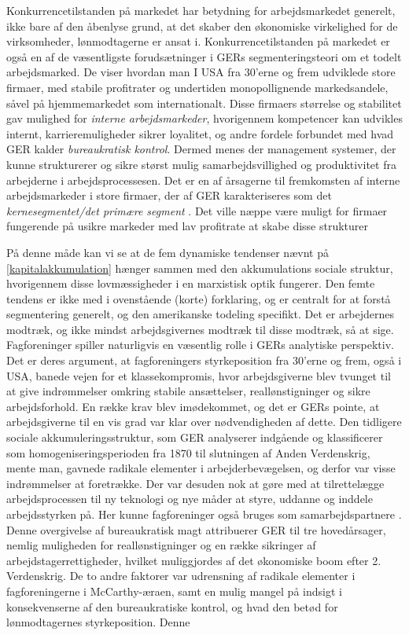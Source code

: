 Konkurrencetilstanden på markedet har betydning for arbejdsmarkedet generelt, ikke bare af den åbenlyse grund, at det skaber den økonomiske virkelighed for de virksomheder, lønmodtagerne er ansat i. Konkurrencetilstanden på markedet er også en af de væsentligste forudsætninger i GERs segmenteringsteori om et todelt arbejdsmarked. De viser hvordan man I USA fra 30'erne og frem udviklede store firmaer, med stabile profitrater og undertiden monopollignende markedsandele, såvel på hjemmemarkedet som internationalt. Disse firmaers størrelse og stabilitet gav mulighed for \emph{interne arbejdsmarkeder}, hvorigennem kompetencer kan udvikles internt, karrieremuligheder sikrer loyalitet, og andre fordele forbundet med hvad GER kalder \emph{bureaukratisk kontrol}. Dermed menes der management systemer, der kunne strukturerer og sikre størst mulig samarbejdsvillighed og produktivitet fra arbejderne i arbejdsprocessesen. Det er en af årsagerne til fremkomsten af interne arbejdsmarkeder i store firmaer, der af GER karakteriseres som det \emph{kernesegmentet/det primære segment} \parencite[187]{Gordon1982}. Det ville næppe være muligt for firmaer fungerende på usikre markeder med lav profitrate at skabe disse strukturer  

På denne måde kan vi se at de fem dynamiske tendenser nævnt på \ref{kapitalakkumulation} hænger sammen med den akkumulations sociale struktur, hvorigennem disse lovmæssigheder i en marxistisk optik fungerer. Den femte tendens er ikke med i ovenstående (korte) forklaring, og er centralt for at forstå segmentering generelt, og den amerikanske todeling specifikt. Det er arbejdernes modtræk, og ikke mindst arbejdsgivernes modtræk til disse modtræk, så at sige. 
Fagforeninger spiller naturligvis en væsentlig rolle i GERs analytiske perspektiv. Det er deres argument, at fagforeningers styrkeposition fra 30'erne og frem, også i USA, banede vejen for et klassekompromis, hvor arbejdsgiverne blev tvunget til at give indrømmelser omkring stabile ansættelser, reallønstigninger og sikre arbejdsforhold. En række krav blev imødekommet, og det er GERs pointe, at arbejdsgiverne til en vis grad var klar over nødvendigheden af dette. Den tidligere sociale akkumuleringsstruktur, som GER analyserer indgående og klassificerer som homogeniseringsperioden fra 1870 til slutningen af Anden Verdenskrig, mente man, gavnede radikale elementer i arbejderbevægelsen, og derfor var visse indrømmelser at foretrække. Der var desuden nok at gøre med at tilrettelægge arbejdsprocessen til ny teknologi og nye måder at styre, uddanne og inddele arbejdsstyrken på. Her kunne fagforeninger også bruges som samarbejdspartnere \parencite[186f]{Gordon1982}. Denne overgivelse af bureaukratisk magt attribuerer GER til tre hovedårsager, nemlig muligheden for reallønstigninger og en række sikringer af arbejdstagerrettigheder, hvilket muliggjordes af det økonomiske boom efter 2. Verdenskrig. De to andre faktorer var udrensning af radikale elementer i fagforeningerne i McCarthy-æraen, samt en mulig mangel på indsigt i konsekvenserne af den bureaukratiske kontrol, og hvad den betød for lønmodtagernes styrkeposition. Denne   

